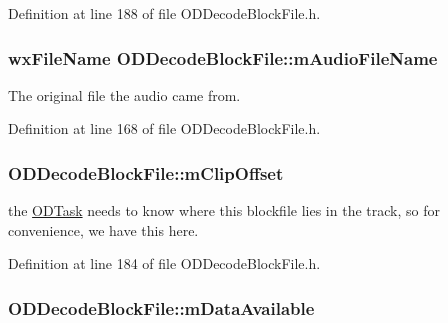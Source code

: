 Definition at line 188 of file O\+D\+Decode\+Block\+File.\+h.

\subsubsection[{\texorpdfstring{m\+Audio\+File\+Name}{mAudioFileName}}]{\setlength{\rightskip}{0pt plus 5cm}wx\+File\+Name O\+D\+Decode\+Block\+File\+::m\+Audio\+File\+Name\hspace{0.3cm}{\ttfamily [protected]}}\hypertarget{class_o_d_decode_block_file_a0cbe5f7b9edfe31d13015915023bd925}{}\label{class_o_d_decode_block_file_a0cbe5f7b9edfe31d13015915023bd925}


The original file the audio came from. 



Definition at line 168 of file O\+D\+Decode\+Block\+File.\+h.

\subsubsection[{\texorpdfstring{m\+Clip\+Offset}{mClipOffset}}]{ O\+D\+Decode\+Block\+File\+::m\+Clip\+Offset\hspace{0.3cm}{\ttfamily [protected]}}\hypertarget{class_o_d_decode_block_file_af07a83b218dc68e77b47055cff66eebc}{}\label{class_o_d_decode_block_file_af07a83b218dc68e77b47055cff66eebc}


the \hyperlink{class_o_d_task}{O\+D\+Task} needs to know where this blockfile lies in the track, so for convenience, we have this here. 



Definition at line 184 of file O\+D\+Decode\+Block\+File.\+h.

\subsubsection[{\texorpdfstring{m\+Data\+Available}{mDataAvailable}}]{ O\+D\+Decode\+Block\+File\+::m\+Data\+Available\hspace{0.3cm}{\ttfamily [protected]}}\hypertarget{class_o_d_decode_block_file_a32425d79034385bb33e3a3d2572cf920}{}\label{class_o_d_decode_block_file_a32425d79034385bb33e3a3d2572cf920}



